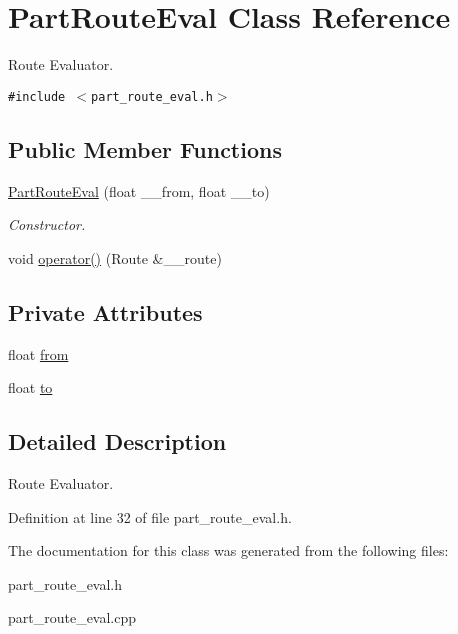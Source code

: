 \hypertarget{classPartRouteEval}{
\section{Part\-Route\-Eval Class Reference}
\label{classPartRouteEval}
}
Route Evaluator.  


{\tt \#include $<$part\_\-route\_\-eval.h$>$}

\subsection*{Public Member Functions}
\begin{CompactItemize}
\item 
\hypertarget{classPartRouteEval_a331566b29bc3227f377004232f05491}{
\hyperlink{classPartRouteEval_a331566b29bc3227f377004232f05491}{Part\-Route\-Eval} (float \_\-\_\-from, float \_\-\_\-to)}
\label{classPartRouteEval_a331566b29bc3227f377004232f05491}

\begin{CompactList}\small\item\em Constructor. \item\end{CompactList}\item 
\hypertarget{classPartRouteEval_965fab875fb601f17934a6ece761beae}{
void \hyperlink{classPartRouteEval_965fab875fb601f17934a6ece761beae}{operator()} (Route \&\_\-\_\-route)}
\label{classPartRouteEval_965fab875fb601f17934a6ece761beae}

\end{CompactItemize}
\subsection*{Private Attributes}
\begin{CompactItemize}
\item 
\hypertarget{classPartRouteEval_5bde722e66378b2570ae6c4b4f8df58e}{
float \hyperlink{classPartRouteEval_5bde722e66378b2570ae6c4b4f8df58e}{from}}
\label{classPartRouteEval_5bde722e66378b2570ae6c4b4f8df58e}

\item 
\hypertarget{classPartRouteEval_de53cc919faa498663f327b72c357da3}{
float \hyperlink{classPartRouteEval_de53cc919faa498663f327b72c357da3}{to}}
\label{classPartRouteEval_de53cc919faa498663f327b72c357da3}

\end{CompactItemize}


\subsection{Detailed Description}
Route Evaluator. 



Definition at line 32 of file part\_\-route\_\-eval.h.

The documentation for this class was generated from the following files:\begin{CompactItemize}
\item 
part\_\-route\_\-eval.h\item 
part\_\-route\_\-eval.cpp\end{CompactItemize}
